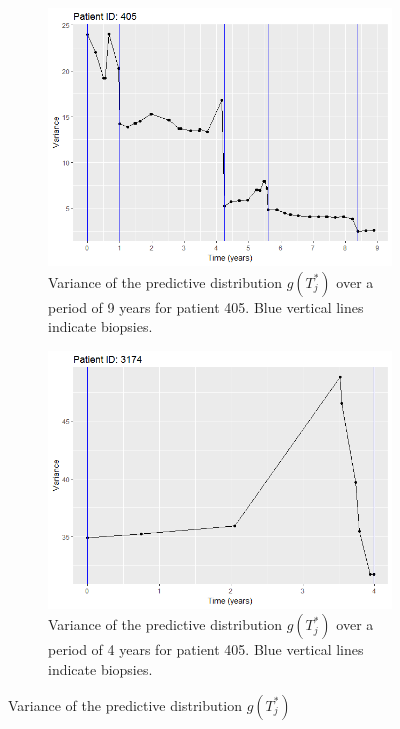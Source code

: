 \begin{figure}[!htb]
    \centering
    \captionsetup{justification=centering}
    \begin{subfigure}[b]{0.45\textwidth}
        \includegraphics[width=\textwidth]{images/variance_pred_dist_405.png}
        \caption{Variance of the predictive distribution $g(T^*_j)$ over a period of 9 years for patient 405. Blue vertical lines indicate biopsies.}
        \label{fig : variance_pred_dist_405}
    \end{subfigure}   
    \begin{subfigure}[b]{0.45\textwidth}
        \includegraphics[width=\textwidth]{images/variance_pred_dist_3174.png}
        \caption{Variance of the predictive distribution $g(T^*_j)$ over a period of 4 years for patient 405. Blue vertical lines indicate biopsies.}
        \label{fig : variance_pred_dist_3174}
    \end{subfigure}
    \caption{Variance of the predictive distribution $g(T^*_j)$}\label{fig : variance_pred_dist}
\end{figure}

